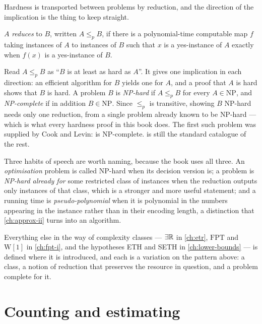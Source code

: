 Hardness is transported between problems by reduction, and the direction of
the implication is the thing to keep straight.

\begin{definition}\label{def:prelim-reduction}
$A$ \emph{reduces} to $B$, written $A \le_p B$, if there is a polynomial-time
computable map $f$ taking instances of $A$ to instances of $B$ such that $x$ is
a yes-instance of $A$ exactly when $f(x)$ is a yes-instance of $B$.
\end{definition}

Read $A \le_p B$ as ``$B$ is at least as hard as $A$''. It gives one
implication in each direction: an efficient algorithm for $B$ yields one for
$A$, and a proof that $A$ is hard shows that $B$ is hard. A problem $B$ is
\emph{\textrm{NP}-hard} if $A \le_p B$ for every $A \in \mathrm{NP}$, and
\emph{\textrm{NP}-complete} if in addition $B \in \mathrm{NP}$. Since $\le_p$
is transitive, showing $B$ \textrm{NP}-hard needs only one reduction, from a
single problem already known to be \textrm{NP}-hard --- which is what every
hardness proof in this book does. The first such problem was supplied by
Cook and Levin:  is \textrm{NP}-complete.  is
still the standard catalogue of the rest.

Three habits of speech are worth naming, because the book uses all three.
An \emph{optimisation} problem is called \textrm{NP}-hard when its decision
version is; a problem is \emph{\textrm{NP}-hard already for} some restricted
class of instances when the reduction outputs only instances of that class,
which is a stronger and more useful statement; and a running time is
\emph{pseudo-polynomial} when it is polynomial in the numbers appearing in the
instance rather than in their encoding length, a distinction that
\cref{ch:approx-ii} turns into an algorithm.

Everything else in the way of complexity classes --- $\exists\mathbb{R}$ in
\cref{ch:etr}, $\mathrm{FPT}$ and $\mathrm{W}[1]$ in \cref{ch:fpt-i}, and the
hypotheses ETH and SETH in \cref{ch:lower-bounds} --- is defined where it is
introduced, and each is a variation on the pattern above: a class, a notion of
reduction that preserves the resource in question, and a problem complete for
it.

\section{Counting and estimating}
\label{sec:prelim-counting}

